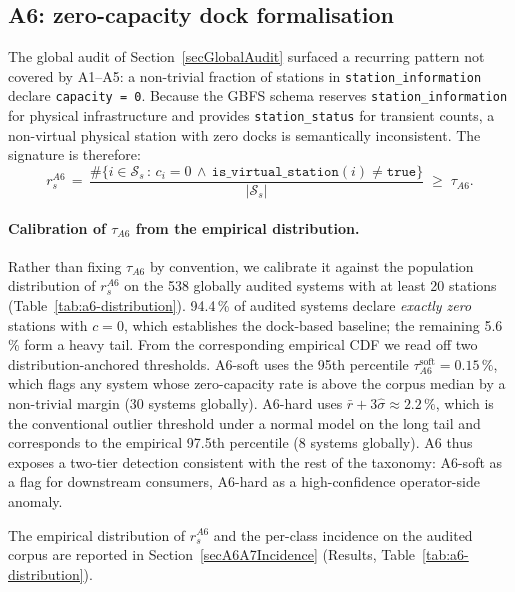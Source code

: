 \documentclass[11pt,a4paper]{article}
\begin{document}
\subsection{A6: zero-capacity dock formalisation}\label{secA6Formalisation}
The global audit of Section~\ref{secGlobalAudit} surfaced a recurring
pattern not covered by A1--A5: a non-trivial fraction of stations in
\texttt{station\_information} declare \texttt{capacity = 0}. Because
the GBFS schema reserves \texttt{station\_information} for physical
infrastructure and provides \texttt{station\_status} for transient
counts, a non-virtual physical station with zero docks is
semantically inconsistent. The signature is therefore:
\begin{equation}
r_s^{A6} \,=\,
\frac{\#\{i \in \mathcal{S}_s \,:\, c_i = 0 \,\land\, \mathtt{is\_virtual\_station}(i) \neq \mathtt{true}\}}{|\mathcal{S}_s|}
\;\geq\; \tau_{A6}.
\end{equation}

\paragraph{Calibration of $\tau_{A6}$ from the empirical distribution.}
Rather than fixing $\tau_{A6}$ by convention, we calibrate it against
the population distribution of $r_s^{A6}$ on the 538 globally audited
systems with at least 20 stations
(Table~\ref{tab:a6-distribution}). 94.4\,\% of audited systems
declare \emph{exactly zero} stations with $c = 0$, which establishes
the dock-based baseline; the remaining 5.6\,\% form a heavy tail.
From the corresponding empirical CDF we read off two
distribution-anchored thresholds. A6-soft uses the 95th percentile
$\tau_{A6}^{\text{soft}} = 0.15\,\%$, which flags any system whose
zero-capacity rate is above the corpus median by a non-trivial
margin (30 systems globally). A6-hard uses $\bar r + 3\hat\sigma
\approx 2.2\,\%$, which is the conventional outlier threshold under
a normal model on the long tail and corresponds to the empirical
97.5th percentile (8 systems globally). A6 thus exposes a two-tier
detection consistent with the rest of the taxonomy: A6-soft as a
flag for downstream consumers, A6-hard as a high-confidence
operator-side anomaly.

The empirical distribution of $r_s^{A6}$ and the per-class
incidence on the audited corpus are reported in
Section~\ref{secA6A7Incidence} (Results,
Table~\ref{tab:a6-distribution}).
\end{document}
